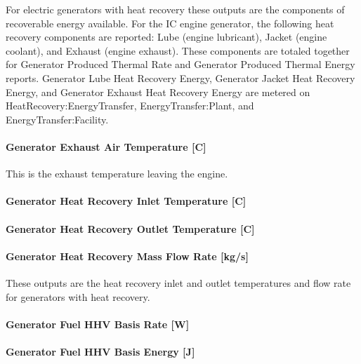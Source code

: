 For electric generators with heat recovery these outputs are the components of recoverable energy available. For the IC engine generator, the following heat recovery components are reported: Lube (engine lubricant), Jacket (engine coolant), and Exhaust (engine exhaust). These components are totaled together for Generator Produced Thermal Rate and Generator Produced Thermal Energy reports. Generator Lube Heat Recovery Energy, Generator Jacket Heat Recovery Energy, and Generator Exhaust Heat Recovery Energy are metered on HeatRecovery:EnergyTransfer, EnergyTransfer:Plant, and EnergyTransfer:Facility.

\paragraph{Generator Exhaust Air Temperature {[}C{]}}\label{generator-exhaust-air-temperature-c}

This is the exhaust temperature leaving the engine.

\paragraph{Generator Heat Recovery Inlet Temperature {[}C{]}}\label{generator-heat-recovery-inlet-temperature-c}

\paragraph{Generator Heat Recovery Outlet Temperature {[}C{]}}\label{generator-heat-recovery-outlet-temperature-c}

\paragraph{Generator Heat Recovery Mass Flow Rate {[}kg/s{]}}\label{generator-heat-recovery-mass-flow-rate-kgs}

These outputs are the heat recovery inlet and outlet temperatures and flow rate for generators with heat recovery.

\paragraph{Generator Fuel HHV Basis Rate {[}W{]}}\label{generator-fuel-hhv-basis-rate-w}

\paragraph{Generator Fuel HHV Basis Energy {[}J{]}}\label{generator-fuel-hhv-basis-energy-j}

